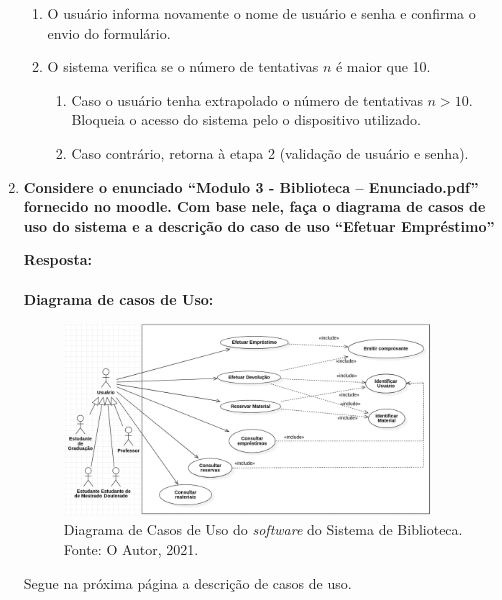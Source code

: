 \documentclass[12pt, a4paper]{article}
\newcommand{\tit}[1]{\textit{#1}}
\newcommand{\tb}[1]{\textbf{#1}}
\newcommand{\ssw}{\tit{software} }
\newcommand{\question}[1]{\item \tb{#1}}
\newcommand{\answer}[1]{\par \tb{Resposta:} #1}
\begin{document}
\begin{enumerate}[label=\textbf{\arabic*.}]
{\begin{enumerate}[label={\arabic*.}]
\begin{enumerate}[label={\alph*.}]
\begin{enumerate}[label={\roman*.}]
\begin{itemize}
                         \end{itemize}
                     \end{enumerate}
                 \end{enumerate}
                \item O usuário informa novamente o nome de usuário e senha e confirma o envio do formulário.
                \item O sistema verifica se o número de tentativas $n$ é maior que 10.
                    \begin{enumerate}
                         \item Caso o usuário tenha extrapolado o número de tentativas $n>10$. Bloqueia o acesso do sistema pelo o dispositivo utilizado.
                         \item Caso contrário, retorna à etapa 2 (validação de usuário e senha).
                     \end{enumerate}
             \end{enumerate}
        }
        \newpage
 
    
        \question{Considere o enunciado “Modulo 3 - Biblioteca – Enunciado.pdf” fornecido no moodle. Com base nele, faça o diagrama de casos de uso do sistema e a descrição do caso de uso “Efetuar Empréstimo”}
        \answer{ \\ \\
          \tb{Diagrama de casos de Uso:}\\
          \begin{figure}[ht!]
               \centering
               \includegraphics[width=0.92\textwidth]{quest6.png}
               \caption{Diagrama de Casos de Uso do \ssw do Sistema de Biblioteca. Fonte: O Autor, 2021.}
               \label{fig:quest6}
           \end{figure}
           
           Segue na próxima página a descrição de casos de uso.
            
}
\end{enumerate}
\end{document}
